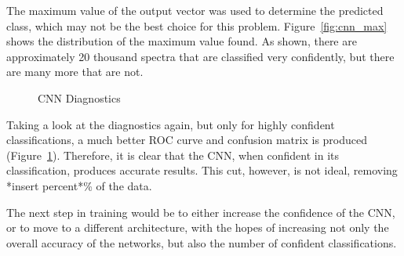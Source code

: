 The maximum value of the output vector was used to determine the predicted class,
which may not be the best choice for this problem. Figure~\ref{fig:cnn_max} shows
the distribution of the maximum value found. As shown, there are approximately 
20 thousand spectra that are classified very confidently, but there are many
more that are not.
\begin{figure}[h]
    \centering
    \qquad
    \caption{CNN Diagnostics\label{fig:cnn_qual2}}
\end{figure}

Taking a look at the diagnostics again, but only for highly confident classifications,
a much better ROC curve and confusion matrix is produced (Figure~\ref{fig:cnn_qual2}). 
Therefore, it is clear that the CNN, when confident in its classification, produces 
accurate results. This cut, however, is not ideal, removing *insert percent*\% of the 
data. 

The next step in training would be to either increase the confidence of the CNN, 
or to move to a different architecture, with the hopes of increasing not only 
the overall accuracy of the networks, but also the number of confident classifications.

